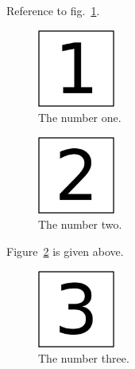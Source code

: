 \newcommand{\plusnamesingular}{}
\newcommand{\starnamesingular}{}
\newcommand{\xrefname}[1]{\protect\renewcommand{\plusnamesingular}{#1}}
\newcommand{\Xrefname}[1]{\protect\renewcommand{\starnamesingular}{#1}}
\providecommand{\cref}{\plusnamesingular~\ref}
\providecommand{\Cref}{\starnamesingular~\ref}
\providecommand{\crefformat}[2]{}
\providecommand{\Crefformat}[2]{}

\crefformat{figure}{fig.~#2#1#3}
\Crefformat{figure}{Figure~#2#1#3}

Reference to \xrefname{fig.}\cref{fig:1}.

\begin{figure}
\centering
\includegraphics[width=1in,height=\textheight]{img/fig-1.png}
\caption{The number one.\label{fig:1}}
\end{figure}

\begin{figure}
\centering
\includegraphics[width=1in,height=\textheight]{img/fig-2.png}
\caption{The number two.\label{fig:2}}
\end{figure}

\Xrefname{Figure}\Cref{fig:2} is given above.

\begin{figure}
\centering
\includegraphics[width=1in,height=\textheight]{img/fig-3.png}
\caption{The number three.}
\end{figure}
